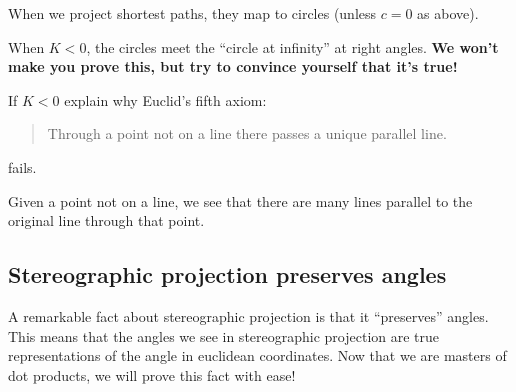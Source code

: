 \documentclass[newpage,handout,hints,12pt,noauthor,nooutcomes]{ximera}
\begin{document}
When we project shortest paths, they map to circles (unless $c=0$ as above).

When $K<0$, the circles meet the ``circle at infinity'' at right angles.
\textbf{We won't make you prove this, but try to convince yourself that it's true!}

\begin{center}
\end{center}

\begin{problem}
  If $K<0$ explain why Euclid's fifth axiom:
  \begin{quote}
    Through a point not on a line there passes a unique parallel line.
  \end{quote}
  fails.
  \begin{freeResponse}
    Given a point not on a line, we see that there are many lines
    parallel to the original line through that point.
  \end{freeResponse}
\end{problem}







\subsection{Stereographic projection preserves angles}


A remarkable fact about stereographic projection is that it
``preserves'' angles. This means that the angles we see in
stereographic projection are true representations of the angle in
euclidean coordinates.  Now that we are masters of dot products, we
will prove this fact with ease!
\end{document}
